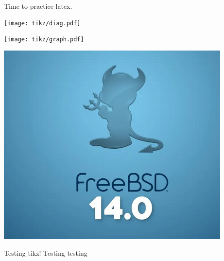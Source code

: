 \documentclass{article}
\begin{document}
	Time to practice latex.

	\texttt{[image: tikz/diag.pdf]}

	\texttt{[image: tikz/graph.pdf]}

	\includegraphics[scale=0.5]{freebsd.png}

	Testing tikz!
	Testing testing
	
\end{document}
